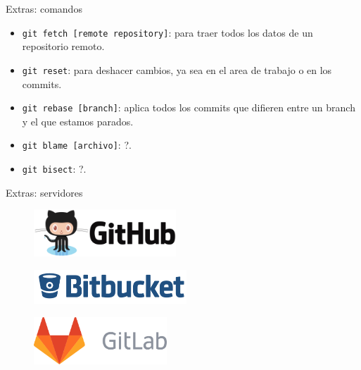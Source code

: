 \begin{frame}[t]{Extras: comandos}

    \begin{itemize}
        \item \texttt{git fetch [remote repository]}: para traer todos los datos de un repositorio remoto.
        \item \texttt{git reset}: para deshacer cambios, ya sea en el area de trabajo o en los commits.
        \item \texttt{git rebase [branch]}: aplica todos los commits que difieren entre un branch y el que estamos parados.
        \item \texttt{git blame [archivo]}: ?.
        \item \texttt{git bisect}: ?.
    \end{itemize}

\end{frame}

\begin{frame}[t]{Extras: servidores}

    \begin{figure}[ht]
        \begin{center}
            \includegraphics[height=0.7in]{images/github.png}
        \end{center}
    \end{figure}

    \begin{figure}[ht]
        \begin{center}
            \includegraphics[height=0.5in]{images/bitbucket.png}
        \end{center}
    \end{figure}

    \begin{figure}[ht]
        \begin{center}
            \includegraphics[height=0.7in]{images/gitlab.png}
        \end{center}
    \end{figure}

\end{frame}

